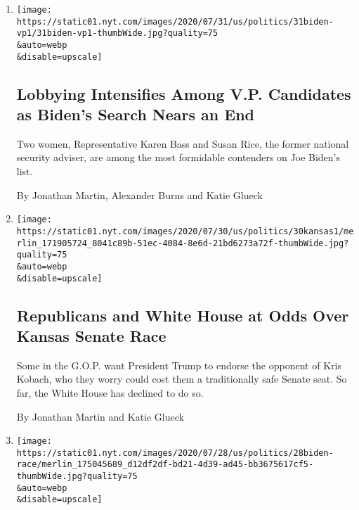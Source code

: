 \begin{enumerate}
\def\labelenumi{\arabic{enumi}.}
\item
  \href{/2020/07/31/us/politics/joseph-biden-vice-president.html}{}

  \texttt{[image: https://static01.nyt.com/images/2020/07/31/us/politics/31biden-vp1/31biden-vp1-thumbWide.jpg?quality=75\\\&auto=webp\\\&disable=upscale]}

  \hypertarget{lobbying-intensifies-among-vp-candidates-as-bidens-search-nears-an-end}{%
  \subsection{Lobbying Intensifies Among V.P. Candidates as Biden's
  Search Nears an
  End}\label{lobbying-intensifies-among-vp-candidates-as-bidens-search-nears-an-end}}

  Two women, Representative Karen Bass and Susan Rice, the former
  national security adviser, are among the most formidable contenders on
  Joe Biden's list.

  By Jonathan Martin, Alexander Burns and Katie Glueck
\item
  \href{/2020/07/30/us/politics/kansas-senate-kobach-trump.html}{}

  \texttt{[image: https://static01.nyt.com/images/2020/07/30/us/politics/30kansas1/merlin\_171905724\_8041c89b-51ec-4084-8e6d-21bd6273a72f-thumbWide.jpg?quality=75\\\&auto=webp\\\&disable=upscale]}

  \hypertarget{republicans-and-white-house-at-odds-over-kansas-senate-race}{%
  \subsection{Republicans and White House at Odds Over Kansas Senate
  Race}\label{republicans-and-white-house-at-odds-over-kansas-senate-race}}

  Some in the G.O.P. want President Trump to endorse the opponent of
  Kris Kobach, who they worry could cost them a traditionally safe
  Senate seat. So far, the White House has declined to do so.

  By Jonathan Martin and Katie Glueck
\item
  \href{/2020/07/28/us/politics/joe-biden-racial-justice-economy-plan.html}{}

  \texttt{[image: https://static01.nyt.com/images/2020/07/28/us/politics/28biden-race/merlin\_175045689\_d12df2df-bd21-4d39-ad45-bb3675617cf5-thumbWide.jpg?quality=75\\\&auto=webp\\\&disable=upscale]}


\end{enumerate}
